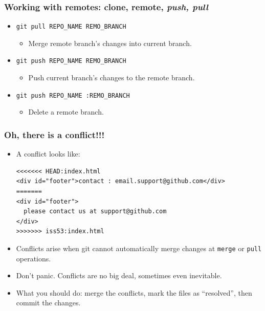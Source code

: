 \documentclass[11pt,ignorenonframetext,]{beamer}
\begin{document}
\begin{frame}[fragile]\frametitle{Working with \textbf{remotes}: clone,
remote, \emph{push, pull}}

\begin{itemize}
\item
  \texttt{git pull REPO\_NAME REMO\_BRANCH}
  \begin{itemize}
  \item
    Merge remote branch's changes into current branch.
  \end{itemize}
\item
  \texttt{git push REPO\_NAME REMO\_BRANCH}
  \begin{itemize}
  \item
    Push current branch's changes to the remote branch.
  \end{itemize}
\item
  \texttt{git push REPO\_NAME :REMO\_BRANCH}
  \begin{itemize}
  \item
    Delete a remote branch.
  \end{itemize}
\end{itemize}
\end{frame}

\begin{frame}[fragile, label=gitconflict]\frametitle{Oh, there is a conflict!!!}

\begin{itemize}
\item
  A conflict looks like:

{\small
\begin{verbatim}
<<<<<<< HEAD:index.html
<div id="footer">contact : email.support@github.com</div>
=======
<div id="footer">
  please contact us at support@github.com
</div>
>>>>>>> iss53:index.html
\end{verbatim}
}

\item
  Conflicts arise when git cannot automatically merge changes at
  \texttt{merge} or \texttt{pull} operations.
\item
  Don't panic. Conflicts are no big deal, sometimes even inevitable.
\item
  What you should do: merge the conflicts, mark the files as
  ``resolved'', then commit the changes.
\end{itemize}
\end{frame}
\end{document}
